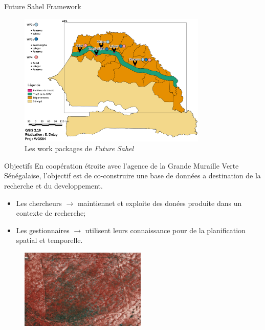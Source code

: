 \documentclass[newPxFont]{beamer}
\begin{document}
\begin{frame}[c]{Future Sahel Framework}
\vspace{-1cm}
\begin{figure}
	\centering
	\includegraphics[width = 0.8\textwidth]{img/Carte_FutureSahel}
	\caption{Les work packages de \textit{Future Sahel}}
\end{figure}
\end{frame}


\begin{frame}[c]{Objectifs}
\vspace{-1cm}
En coopération étroite avec l'agence de la Grande Muraille Verte Sénégalaise, l'objectif est de co-construire une base de données a destination de la recherche et du developpement.
	\begin{itemize}
		\item Les chercheurs $\rightarrow$ maintiennet et exploite des donées produite dans un contexte de recherche;
		\item Les gestionnaires $\rightarrow$ utilisent leurs connaissance pour de la planification spatial et temporelle.
	\end{itemize}
  \begin{figure}
  	\centering
  	\includegraphics[width = 6cm]{img/IR_spot}
  \end{figure}
\end{frame}
\end{document}
